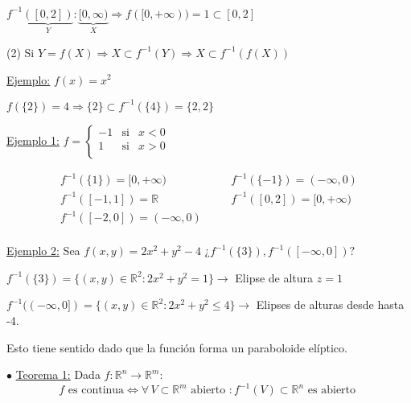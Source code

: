 \documentclass[12pt, titlepage]{article}
\newcommand{\R}{\mathbb{R}}
\newcommand{\teorema}[1][\!\!]{\noindent$\bullet$ \underline{Teorema #1:} }
\newcommand{\dindent}{\indent\indent}
\newcommand{\tindent}{\indent\indent\indent}
\begin{document}
\tindent $f^{-1} \underbrace{([0, 2])}_{Y} : \underbrace{[0, \infty)}_{X} \Rightarrow f ([0, +\infty)) = {1} \subset 
[0, 2]$
\vspace{3mm}

\dindent (2) Si $Y = f (X) \Rightarrow X \subset f^{-1} (Y) \Rightarrow X \subset f^{-1} (f (X))$
\vspace{3mm}

\tindent \underline{Ejemplo:} $f (x) = x^2$
\vspace{2mm}

\tindent $f (\{2\}) = 4 \Rightarrow \{2\} \subset f^{-1} (\{4\}) = \{2, 2\}$
\vspace{5mm}

\underline{Ejemplo 1:} $
f = 
\left \{ \begin{array}{ccc}

-1 & \text{si} & x < 0\\
1 & \text{si} & x>0\\

\end{array}\right.
$
\vspace{3mm}

\[
\begin{array}{lccrc}

f^{-1} (\{1\}) = [0, +\infty) & \quad & f^{-1} (\{-1\}) = (- \infty, 0)\\
f^{-1} ([-1, 1]) = \R & \quad & f^{-1} ([0, 2]) = [0, +\infty)\\
f^{-1} ([-2, 0]) = (-\infty, 0) & \quad &\\

\end{array}
\]
\vspace{3mm}

\underline{Ejemplo 2:} Sea $f (x, y) = 2x^2 + y^2 - 4 \text{ ¿}f^{-1} (\{3\}), f^{-1} ([-\infty, 0])\text{?}$
\vspace{2mm}

$f^{-1} (\{3\}) = \{(x, y) \in \R^2 : 2x^2+ y^2 = 1\} \rightarrow$ Elipse de altura $z =1$

$f^{-1} ((-\infty, 0]) = \{(x, y) \in \R^2 : 2x^2+ y^2 \leq 4\} \rightarrow$ Elipses de alturas desde  hasta -4.

Esto tiene sentido dado que la función forma un paraboloide elíptico.
\vspace{5mm}

\teorema[1] Dada $f : \R^n \to \R^m$:
\[
\boxed{
f \text{ es continua} \iff \forall \, V \subset \R^m \text{ abierto } : f^{-1} (V) \subset \R^n \text{ es 
abierto }
}
\]
\vspace{3mm}
\end{document}

